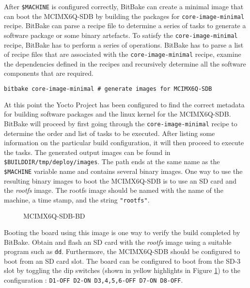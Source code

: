 After \texttt{\$MACHINE} is configured correctly, BitBake can create a minimal image that can boot the MCIMX6Q-SDB by building the packages for \texttt{core-image-minimal} recipe. BitBake can parse a recipe file to determine a series of tasks to generate a software package or some binary artefacts. To satisfy the \texttt{core-image-minimal} recipe, BitBake has to perform a series of operations. BitBake has to parse a list of recipe files that are associated with the \texttt{core-image-minimal} recipe, examine the dependencies defined in the recipes and recursively determine all the software components that are required.

\begin{verbatim}
bitbake core-image-minimal # generate images for MCIMX6Q-SDB
\end{verbatim}

At this point the Yocto Project has been configured to find the correct metadata for building software packages and the linux kernel for the MCIMX6Q-SDB. BitBake will proceed by first going through the \texttt{core-image-minimal} recipe to determine the order and list of tasks to be executed. After listing some information on the particular build configuration, it will then proceed to execute the tasks. The generated output images can be found in \texttt{\$BUILDDIR/tmp/deploy/images}. The path ends at the same name as the \texttt{\$MACHINE} variable name and contains several binary images. One way to use the resulting binary images to boot the MCIMX6Q-SDB is to use an SD card and the \textit{rootfs} image. The rootfs image should be named with the name of the machine, a time stamp, and the string \texttt{"rootfs"}.


\begin{figure}[h]
	\centering
	\caption{MCIMX6Q-SDB-BD}
	\label{fig:mcimx6q-sdb}
\end{figure}

Booting the board using this image is one way to verify the build completed by BitBake. Obtain and flash an SD card with the \textit{rootfs} image using a suitable program such as \texttt{dd}. Furthermore, the MCIMX6Q-SDB should be configured to boot from an SD card slot. The board can be configured to boot from the SD-3 slot by toggling the dip switches (shown in yellow highlights in Figure \ref{fig:mcimx6q-sdb}) to the configuration : \texttt{D1-OFF D2-ON D3,4,5,6-OFF D7-ON D8-OFF}.


